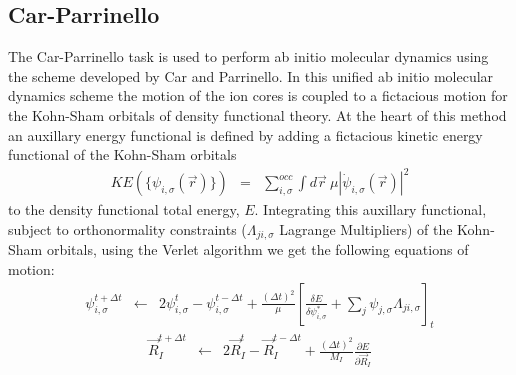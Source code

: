 \subsection{Car-Parrinello}
The Car-Parrinello task is used to perform ab initio molecular dynamics
using the scheme developed by Car and Parrinello.  In this unified ab
initio molecular dynamics scheme the motion of the ion cores is coupled to
a fictacious motion for the Kohn-Sham orbitals of density functional
theory.  At the heart of this method an auxillary energy functional is 
defined by adding a fictacious kinetic energy functional of the Kohn-Sham 
orbitals
\begin{eqnarray}
\label{appendix:b1}
KE(\{\psi_{i,\sigma}(\vec{r})\}) &=& \sum_{i,\sigma}^{occ} 
                                      \int d\vec{r}\ \mu \left| 
                                      \dot{\psi}_{i,\sigma}(\vec{r}) \right|^2 
\end{eqnarray}
to the density functional total energy, $E$.  Integrating this auxillary 
functional, subject to orthonormality constraints 
($\Lambda_{ji,\sigma}$ Lagrange Multipliers) of the Kohn-Sham orbitals,
using the Verlet algorithm we get the following equations of motion:
\begin{eqnarray}
\psi_{i,\sigma}^{t+ \Delta t} 
                   &\leftarrow& 
                    2 \psi_{i,\sigma}^{t} - \psi_{i,\sigma}^{t-\Delta t}
                      + \frac{(\Delta t)^2}{\mu}
                        \left[ 
                           \frac{\delta E}{\delta \psi_{i,\sigma}^{*}}
                            + \sum_{j} \psi_{j,\sigma} \Lambda_{ji,\sigma} 
                        \right]_{t}
\label{eq:b6}
\end{eqnarray}
\begin{eqnarray}
\vec{R}_I^{t+\Delta t} &\leftarrow& 
                    2 \vec{R}_I^{t} - \vec{R}_I^{t-\Delta t}
                    + \frac{(\Delta t)^2}{M_I} 
                       \frac{\partial E}{\partial \vec{R}_I}
\label{eq:b7}
\end{eqnarray}
  
